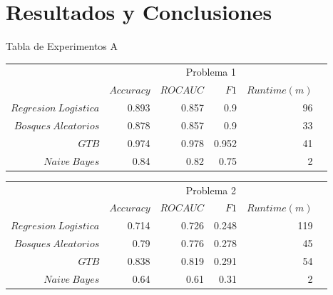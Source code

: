 \documentclass[xcolor=x11names]{beamer}
\newcommand{\ra}[1]{\renewcommand{\arraystretch}{#1}}
\begin{document}
\section{Resultados y Conclusiones}


\begin{frame}{Tabla de Experimentos A}

	\begin{table}[htp]\centering
	\footnotesize
		\ra{1.3}
		\begin{tabular}{@{}rr@{\hskip 0.3cm}r@{\hskip 0.3cm}r@{\hskip 0.3cm}rc@{}} \toprule
			&  \multicolumn{4}{c}{Problema 1} \\
			\cmidrule{2-5}
			& $Accuracy$ & $ROC AUC$ & $F1$ & $Runtime  (m)$ \\ \midrule
			$Regresion \ Logistica$     & 0.893 & 0.857 & 0.9   & 96\\
			$Bosques \ Aleatorios$            & 0.878 & 0.857 & 0.9  & 33 \\
			$GTB$ & 0.974 & 0.978 & 0.952 & 41  \\
			$Naive \ Bayes$               & 0.84  & 0.82  & 0.75  & 2  \\

			\bottomrule
		\end{tabular}


		\ra{1.3}
		\begin{tabular}{@{}rr@{\hskip 0.3cm}r@{\hskip 0.3cm}r@{\hskip 0.3cm}rc@{}} \toprule
			&  \multicolumn{4}{c}{Problema 2} \\
			\cmidrule{2-5}
			& $Accuracy$ & $ROC AUC$ & $F1$ & $Runtime  (m)$ \\ \midrule
			$Regresion \ Logistica$     & 0.714 & 0.726 & 0.248 & 119 \\
			$Bosques \ Aleatorios$            & 0.79  & 0.776 & 0.278 & 45  \\
			$GTB$ & 0.838 & 0.819 & 0.291 & 54 \\
			$Naive \ Bayes$               & 0.64  & 0.61  & 0.31  & 2   \\

			\bottomrule
		\end{tabular}
	\end{table}

\end{frame}
\end{document}
